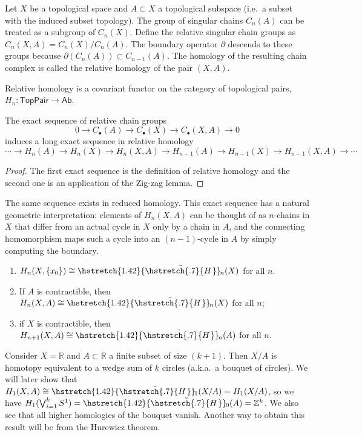 \documentclass[english,letterpaper]{article}%
\numberwithin{equation}{section}
\numberwithin{figure}{section}
\numberwithin{table}{section}
\theoremstyle{definition}
\theoremstyle{definition}
\theoremstyle{definition}
\theoremstyle{plain}
\theoremstyle{plain}
\theoremstyle{plain}
\theoremstyle{plain}
\theoremstyle{remark}
\theoremstyle{remark}
\newcommand{\bbR}{\mathbb{R}}
\newcommand{\bbZ}{\mathbb{Z}}
\newcommand\wt[1]{\hstretch{1.42}{\tilde{\hstretch{.7}{#1\mkern2mu}}}\mkern-2mu}
\begin{document}
\begin{defn}
    Let $X$ be a topological space and $A\subset X$ a topological subspace (i.e.\ a subset with the induced subset topology). The group of singular chains $C_n(A)$ can be treated as a subgroup of $C_n(X)$. Define the relative singular chain groups as $C_n(X,A)=C_n(X)/C_n(A)$. The boundary operator $\partial$ descends to these groups because $\partial(C_n(A))\subset C_{n-1}(A)$. The homology of the resulting chain complex is called the relative homology of the pair $(X,A)$.
\end{defn}

Relative homology is a covariant functor on the category of topological pairs, $H_n:\mathsf{TopPair}\to \mathsf{Ab}$.

\begin{prop}\label{exact seq of a pair}
    The exact sequence of relative chain groups
    \[0\to C_\bullet(A)\to C_\bullet (X)\to C_\bullet(X,A)\to 0 \]
    induces a long exact sequence in relative homology
    \[\cdots \to H_n(A)\to H_n(X)\to H_n(X,A)\to H_{n-1}(A)\to H_{n-1}(X)\to H_{n-1}(X,A)\to \cdots\]
\end{prop}
\begin{proof}
     The first exact sequence is the definition of relative homology and the second one is an application of the Zig-zag lemma.
\end{proof}

The same sequence exists in reduced homology. This exact sequence has a natural geometric interpretation: elements of $H_n(X,A)$ can be thought of as $n$-chains in $X$ that differ from an actual cycle in $X$ only by a chain in $A$, and the connecting homomorphism maps such a cycle into an $(n-1)$-cycle in $A$ by simply computing the boundary.

\begin{cor}
    \begin{enumerate}
        \item $H_n(X,
        \{x_0\})\cong\wt{H}_n(X)$ for all $n$.
        \item If $A$ is contractible, then $H_n(X,A)\cong \wt{H}_n(X)$ for all $n$;
        \item if $X$ is contractible, then $H_{n+1}(X,A)\cong \wt{H}_n(A)$ for all $n$.
    \end{enumerate}
\end{cor}

\begin{example}
    Consider $X=\bbR$ and $A\subset \bbR$ a finite subset of size $(k+1)$. Then $X/A$ is homotopy equivalent to a wedge sum of $k$ circles (a.k.a.\ a bouquet of circles). We will later show that $H_1(X,A)\cong \wt{H}_1(X/A)= H_1(X/A)$, so we have $H_1(\bigvee_{i=1}^{k}S^1)=\wt{H}_0(A)=\bbZ^{k}$. We also see that all higher homologies of the bouquet vanish. Another way to obtain this result will be from the Hurewicz theorem.
\end{example}
\end{document}

